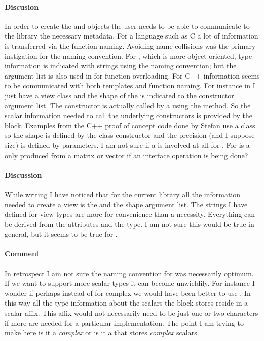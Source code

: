 \paragraph{Discusion}
In order to create the \Blk{} and \Vw{} objects the user needs to be able to communicate to the library the necessary metadata.  For a language such as C a lot of information is transferred via the function naming. Avoiding name collisions was the primary instigation for the \cvl{} naming convention.  For \pyjv{}, which is more object oriented, type information is indicated with strings using the \cvl{} naming convention; but the argument list is also used in \pyjv{} for function overloading.  For C++  information seems to be communicated with both templates and function naming.  For instance in \pyjv{} I just have a view class and the shape of  the \vw{} is indicated to the \Vw{} constructor argument list. The \Vw{} constructor is actually called by a \blk{} using the  method. So the scalar information needed to call the underlying \cvl{} constructors is provided by the block. Examples from the C++ proof of concept code done by Stefan use a  class so the shape is defined by the class constructor and the precision (and I suppose size) is defined by parameters. I am not sure if a \blk{} is involved at all for . For  is a \blk{} only produced from a matrix or vector if an interface operation is being done?
\paragraph{Discussion}
While writing \pyjv{} I have noticed that for the current \cvl{} library all the information needed to create a view is the  and the shape argument list.  The strings I have defined for view types are more for convenience than a necessity. Everything can be derived from the \vw{} attributes and the \blk{} type. I am not sure this would be true in general, but it seems to be true for \cvl{}.
\paragraph{Comment} In retrospect I am not sure the naming convention for \cvl{} was necessarily optimum. If we want to support more scalar types it can become unwieldily.  For instance I wonder if perhaps instead of  for complex we would have been better to use . In this way all the type information about the scalars the block stores reside in a scalar affix.  This affix would not necessarily need to be just one or two characters if more are needed for a particular implementation.  The point I am trying to make here is it a \emph{complex} \blk{} or is it a \blk{} that stores \emph{complex} scalars.
